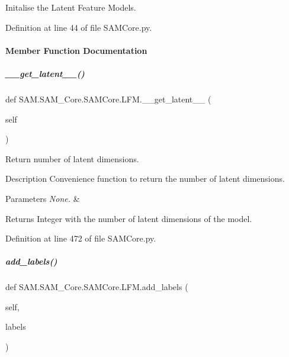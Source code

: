 Initalise the Latent Feature Models. 



Definition at line 44 of file S\+A\+M\+Core.\+py.



\paragraph{Member Function Documentation}
\mbox{\label{group__icubclient__SAM__Core_ad55ab0d5f2e3552e0217bd86daf45ced}} 
\subparagraph{\texorpdfstring{\+\_\+\+\_\+get\+\_\+latent\+\_\+\+\_\+()}{\_\_get\_latent\_\_()}}
{\footnotesize\ttfamily def S\+A\+M.\+S\+A\+M\+\_\+\+Core.\+S\+A\+M\+Core.\+L\+F\+M.\+\_\+\+\_\+get\+\_\+latent\+\_\+\+\_\+ (\begin{DoxyParamCaption}\item[{}]{self }\end{DoxyParamCaption})}



Return number of latent dimensions. 

\begin{DoxyParagraph}{Description}
Convenience function to return the number of latent dimensions.
\end{DoxyParagraph}

\begin{DoxyParams}{Parameters}
{\em None.} & \\
\hline
\end{DoxyParams}
\begin{DoxyReturn}{Returns}
Integer with the number of latent dimensions of the model. 
\end{DoxyReturn}


Definition at line 472 of file S\+A\+M\+Core.\+py.

\mbox{\label{group__icubclient__SAM__Core_a679cfd0b1085a4acc55efa2f5651ef39}} 
\subparagraph{\texorpdfstring{add\+\_\+labels()}{add\_labels()}}
{\footnotesize\ttfamily def S\+A\+M.\+S\+A\+M\+\_\+\+Core.\+S\+A\+M\+Core.\+L\+F\+M.\+add\+\_\+labels (\begin{DoxyParamCaption}\item[{}]{self,  }\item[{}]{labels }\end{DoxyParamCaption})}



